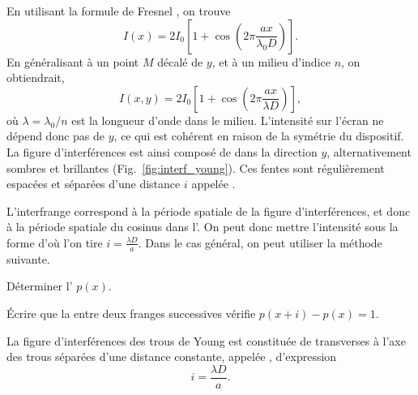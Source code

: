\documentclass[12pt,fancy]{cours}
\begin{document}
 En utilisant la formule de Fresnel , on trouve
\begin{equation}\label{eq:I_young}
I(x)=2I_{0}\left[1+\cos\left(2\pi \frac{a x}{\lambda_0 D}\right)\right].
\end{equation}
En généralisant à un point $M$ décalé de $y$, et à un milieu d’indice $n$, on obtiendrait,
\begin{equation}
I(x,y)=2I_{0}\left[1+\cos\left(2\pi \frac{a x}{\lambda D}\right)\right],
\end{equation}
où $\lambda = \lambda_0/n$ est la longueur d’onde dans le milieu.
L'intensité sur l’écran ne dépend donc pas de $y$, ce qui est cohérent en raison de la symétrie du dispositif. La figure d’interférences est ainsi composé de  dans la direction $y$, alternativement sombres et brillantes (Fig.~\ref{fig:interf_young}). Ces fentes sont régulièrement espacées et séparées d'une distance $i$ appelée .

L'interfrange correspond à la période spatiale de la figure d'interférences, et donc à la période spatiale du cosinus dans l’. On peut donc mettre l’intensité sous la forme
d’où l’on tire $i=\frac{\lambda D}{a}$. Dans le cas général, on peut utiliser la méthode suivante.
\begin{methode}
  \item	Déterminer l’ $p(x)$.
  \item Écrire que la  entre deux franges successives vérifie $p(x+i) - p(x) = 1$.
\end{methode}
\begin{theorem}%
  La figure d’interférences des trous de Young est constituée de  transverses à l’axe des trous séparées d’une distance constante, appelée
    , d’expression
  \begin{equation*}
  i=\frac{\lambda D}{a}.
\end{equation*}
\end{theorem}
\end{document}
